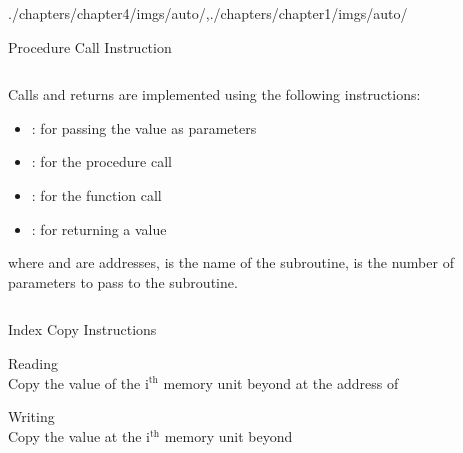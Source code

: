 \begin{graphicspathcontext}{{./chapters/chapter4/imgs/auto/},{./chapters/chapter1/imgs/auto/}}
\begin{bibunit}[apalike]
\begin{frame}[background=9]{Procedure Call Instruction}
	\begin{columns}
		\begin{column}{.8\linewidth}
		\begin{small}
		Calls and returns are implemented using the following instructions: \\
		\vfill
		\begin{itemize}
		\item {}: for passing the value  as parameters
		\vfill
		\item {}: for the procedure call
		\vfill
		\item {}: for the function call
		\vfill
		\item {}: for returning a value
		\end{itemize}
		\vfill
		where  and  are addresses,  is the name of the subroutine,  is the number of parameters to pass to the subroutine.
		\end{small}
		\end{column}
		\begin{column}{.2\linewidth}
			\begin{tac}[\linewidth]
				\tacdots
			\end{tac}
		\end{column}
	\end{columns}
	\vfill
\end{frame}

\begin{frame}{{Index Copy} Instructions}
	\begin{definitionblock}{Reading}
		\emph{} \\
		Copy the value of the i$^{\text{th}}$ memory unit beyond  at the address of 
	\end{definitionblock}
	\vspace{1cm}
	\begin{definitionblock}{Writing}
	\emph{} \\
	Copy the value  at the i$^{\text{th}}$ memory unit beyond 
	\end{definitionblock}
\end{frame}


\end{bibunit}
\end{graphicspathcontext}

